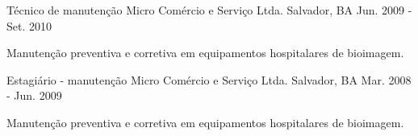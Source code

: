 \begin{cventries}
    
  \cventry
    {Técnico de manutenção} %
    {Micro Comércio e Serviço Ltda.} %
    {Salvador, BA} %
    {Jun. 2009 - Set. 2010} %
    {
      \begin{cvitems} %
        \item {Manutenção preventiva e corretiva em equipamentos hospitalares de bioimagem.}
      \end{cvitems}
    }

  \cventry
    {Estagiário - manutenção} %
    {Micro Comércio e Serviço Ltda.} %
    {Salvador, BA} %
    {Mar. 2008 - Jun. 2009} %
    {
      \begin{cvitems} %
        \item {Manutenção preventiva e corretiva em equipamentos hospitalares de bioimagem.}
      \end{cvitems}
    }


\end{cventries}
